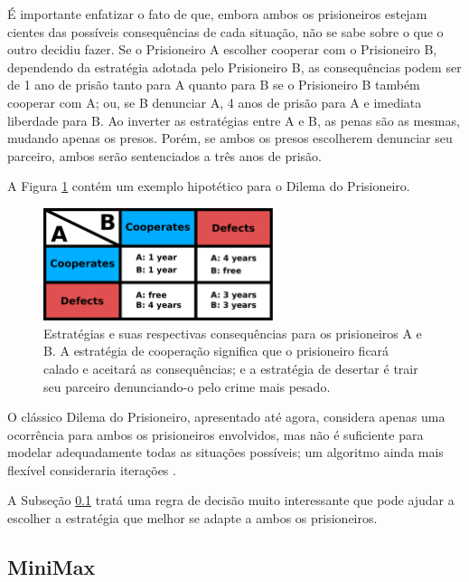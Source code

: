 É importante enfatizar o fato de que, embora ambos os prisioneiros estejam cientes das possíveis consequências de cada situação, não se sabe sobre o que o outro decidiu fazer. Se o Prisioneiro A escolher cooperar com o Prisioneiro B, dependendo da estratégia adotada pelo Prisioneiro B, as consequências podem ser de 1 ano de prisão tanto para A quanto para B se o Prisioneiro B também cooperar com A; ou, se B denunciar A, 4 anos de prisão para A e imediata liberdade para B. Ao inverter as estratégias entre A e B, as penas são as mesmas, mudando apenas os presos. Porém, se ambos os presos escolherem denunciar seu parceiro, ambos serão sentenciados a três anos de prisão.

A Figura \ref{fig:prisoners_dilemma} contém um exemplo hipotético para o Dilema do Prisioneiro.

\begin{figure}[H]
    \centering
    \includegraphics[width=0.60\textwidth]{figs/prisoners_dilemma_3.pdf}
    \caption{Estratégias e suas respectivas consequências para os prisioneiros A e B. A estratégia de cooperação significa que o prisioneiro ficará calado e aceitará as consequências; e a estratégia de desertar é trair seu parceiro denunciando-o pelo crime mais pesado.}
    \label{fig:prisoners_dilemma}
\end{figure}

O clássico Dilema do Prisioneiro, apresentado até agora, considera apenas uma ocorrência para ambos os prisioneiros envolvidos, mas não é suficiente para modelar adequadamente todas as situações possíveis; um algoritmo ainda mais flexível consideraria iterações \citep{press2012iterated}.

A Subseção \ref{subsec:gan_minmax} tratá uma regra de decisão muito interessante que pode ajudar a escolher a estratégia que melhor se adapte a ambos os prisioneiros.




\subsection{MiniMax}
\label{subsec:gan_minmax}

